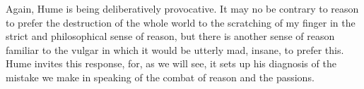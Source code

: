 Again, Hume is being deliberatively provocative. It may no be contrary to reason to prefer the destruction of the whole world to the scratching of my finger in the strict and philosophical sense of reason, but there is another sense of reason familiar to the vulgar in which it would be utterly mad, insane, to prefer this. Hume invites this response, for, as we will see, it sets up his diagnosis of the mistake we make in speaking of the combat of reason and the passions. \change

% 


